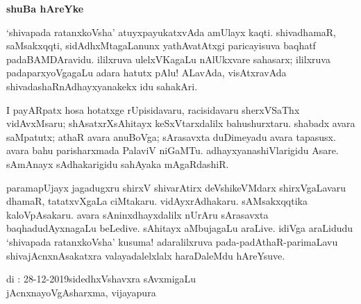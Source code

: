 \begin{center}
{\Huge\bfseries shuBa hAreYke}
\end{center}

\bigskip

`shivapada ratanxkoVsha' atuyxpayukatxvAda amUlayx kaqti. shivadhamaR, saMsakxqqti, sidAdhxMtagaLanunx yathAvatAtxgi paricayisuva baqhatf padaBAMDAravidu. ililxruva ulelxVKagaLu nAlUkxvare sahasarx; ililxruva padaparxyoVgagaLu adara hatutx pAlu! ALavAda, visAtxravAda shivadashaRnAdhayxyanakekx idu sahakAri.

\medskip

I payARpatx hosa hotatxge rUpisidavaru, racisidavaru sherxVSaThx vidAvxMsaru; shAsatxrXsAhitayx keSxVtarxdalilx bahushurxtaru. shabadx avara saMpatutx; athaR avara anuBoVga; sArasavxta duDimeyadu avara tapasusx. avara bahu parisharxmada PalaviV niGaMTu. adhayxyana\-shiVlarigidu Asare. sAmAnayx sAdhakarigidu sahAyaka mAgaRdashiR.

\medskip

paramapUjayx jagadugxru shirxV shivarAtirx deVshikeVMdarx shirxVgaLavaru dhamaR, tatatxvXgaLa ciMtakaru. vidAyxrAdhakaru. sAMsakxqqtika kaloVpAsakaru. avara sAninxdhayxdalilx nUrAru sArasavxta baqhadudAyxnagaLu beLedive. sAhitayx aMbujagaLu araLive. idiVga araLidudu `shivapada ratanxkoVsha' kusuma! adaralilxruva pada-padAthaR-parimaLavu shivajAcnxnAsakatxra valayadalelxlalx haraDaleMdu hAreYsuve.

\vskip 1.5cm

\noindent
di : 28-12-2019\hfill sidedhxVshavxra sAvxmigaLu\qquad\,\\
\phantom{a} \hfill jAcnxnayoVgAsharxma, vijayapura
